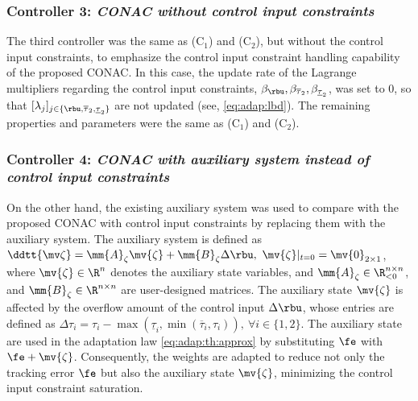 \documentclass[lettersize,journal]{IEEEtran}
\begin{document}
\subsubsection*{Controller 3:  \textit{CONAC without control input constraints}}

The third controller was the same as (C$_1$) and (C$_2$), but without the control input constraints, to emphasize the control input constraint handling capability of the proposed CONAC.
In this case, the update rate of the Lagrange multipliers regarding the control input constraints, \ie $\beta_{\rbu},\beta_{\overline{\tau}_2},\beta_{\underline{\tau}_2}$, was set to $0$, so that $[\lambda_j]_{j\in\{\rbu,\overline{\tau}_2,\underline{\tau}_2\}}$ are not updated (see, \eqref{eq:adap:lbd}).
The remaining properties and parameters were the same as (C$_1$) and (C$_2$).

\subsubsection*{Controller 4:  \textit{CONAC with auxiliary system instead of control input constraints}}

On the other hand, the existing auxiliary system \cite{Esfandiari:2014aa,Karason:1994aa,Esfandiari:2015aa} was used to compare with the proposed CONAC with control input constraints by replacing them with the auxiliary system.
The auxiliary system is defined as $\ddtt{\mv\zeta} = \mm{A}_\zeta \mv{\zeta} + \mm{B}_\zeta \Delta\rbu,\ \mv{\zeta}\vert_{t=0} = \mv{0}_{2\times1}$, where $\mv{\zeta}\in\R^n$ denotes the auxiliary state variables, and $\mm{A}_\zeta\in\R_{<0}^{n\times n}$, and $\mm{B}_\zeta\in\R^{n\times n}$ are user-designed matrices.
The auxiliary state $\mv{\zeta}$ is affected by the overflow amount of the control input $\Delta\rbu$, whose entries are defined as $\Delta\tau_{i} = 
\tau_{i}-\max(\underline\tau_i,\min(\overline\tau_i,\tau_i)),\ \forall i\in\{1,2\}$.
The auxiliary state are used in the adaptation law \eqref{eq:adap:th:approx} by substituting $\fe$ with $\fe+\mv{\zeta}$.
Consequently, the weights are adapted to reduce not only the tracking error $\fe$ but also the auxiliary state $\mv{\zeta}$, minimizing the control input constraint saturation.
\end{document}
